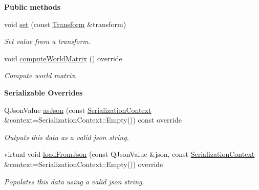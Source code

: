 \begin{Indent}\textbf{ Public methods}\par
\begin{DoxyCompactItemize}
\item 
\mbox{\label{classrev_1_1_transform_component_a6fe0e6e300d2764dacbb9ea8f80ccf0e}} 
void \mbox{\hyperlink{classrev_1_1_transform_component_a6fe0e6e300d2764dacbb9ea8f80ccf0e}{set}} (const \mbox{\hyperlink{classrev_1_1_transform}{Transform}} \&transform)
\begin{DoxyCompactList}\small\item\em Set value from a transform. \end{DoxyCompactList}\item 
\mbox{\label{classrev_1_1_transform_component_afe660eead2c4c6194034b08030c4d675}} 
void \mbox{\hyperlink{classrev_1_1_transform_component_afe660eead2c4c6194034b08030c4d675}{compute\+World\+Matrix}} () override
\begin{DoxyCompactList}\small\item\em Compute world matrix. \end{DoxyCompactList}\end{DoxyCompactItemize}
\end{Indent}
\begin{Indent}\textbf{ Serializable Overrides}\par
\begin{DoxyCompactItemize}
\item 
\mbox{\label{classrev_1_1_transform_component_a659d35fb65e846c12c9bda2c9c855add}} 
Q\+Json\+Value \mbox{\hyperlink{classrev_1_1_transform_component_a659d35fb65e846c12c9bda2c9c855add}{as\+Json}} (const \mbox{\hyperlink{structrev_1_1_serialization_context}{Serialization\+Context}} \&context=Serialization\+Context\+::\+Empty()) const override
\begin{DoxyCompactList}\small\item\em Outputs this data as a valid json string. \end{DoxyCompactList}\item 
\mbox{\label{classrev_1_1_transform_component_a76a1ae206e66ac0454eec2f7d7e0dfe8}} 
virtual void \mbox{\hyperlink{classrev_1_1_transform_component_a76a1ae206e66ac0454eec2f7d7e0dfe8}{load\+From\+Json}} (const Q\+Json\+Value \&json, const \mbox{\hyperlink{structrev_1_1_serialization_context}{Serialization\+Context}} \&context=Serialization\+Context\+::\+Empty()) override
\begin{DoxyCompactList}\small\item\em Populates this data using a valid json string. \end{DoxyCompactList}\end{DoxyCompactItemize}
\end{Indent}
